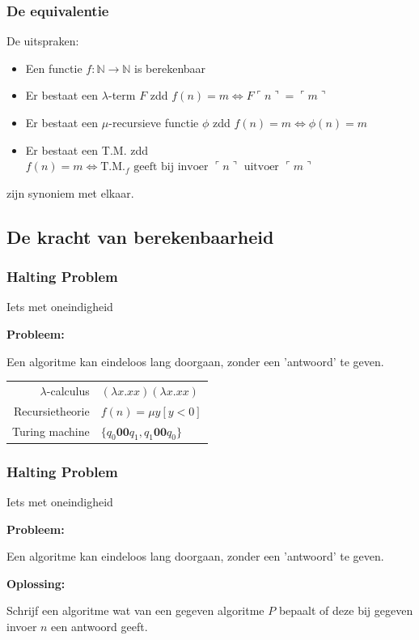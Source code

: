 \documentclass{beamer}
\begin{document}
\begin{frame}
    \frametitle{De equivalentie}

    De uitspraken:
    \begin{itemize}
        \item Een functie $f:\mathbb{N} \rightarrow \mathbb{N}$ is berekenbaar
        \item Er bestaat een $\lambda$-term $F$ zdd $f(n) = m \Leftrightarrow F \ulcorner n\urcorner = \ulcorner m\urcorner $
        \item Er bestaat een $\mu$-recursieve functie $\phi$ zdd $f(n) = m \Leftrightarrow \phi(n) = m$
        \item Er bestaat een T.M. zdd $f(n) = m \Leftrightarrow \text{T.M.}_f \text{ geeft bij invoer } \ulcorner n\urcorner \text{ uitvoer } \ulcorner m\urcorner$
    \end{itemize}

    zijn synoniem met elkaar.
\end{frame}

\subsection{De kracht van berekenbaarheid}
\begin{frame}
    \frametitle{Halting Problem}
    {\Large Iets met oneindigheid}
    \vspace{1cm}

    \textbf{Probleem:}

    Een algoritme kan eindeloos lang doorgaan, zonder een 'antwoord' te geven.\\
    \vspace{1cm}

    \begin{tabular*}{0.8\textwidth}{r l}
        $\lambda$-calculus & $(\lambda x.xx)(\lambda x.xx)$ \\
        Recursietheorie & $f(n) = \mu y [y<0]$ \\
        Turing machine & $\{ q_0\mathbf{0}\mathbf{0}q_1, q_1\mathbf{0}\mathbf{0}q_0 \}$
    \end{tabular*}
\end{frame}

\begin{frame}
    \frametitle{Halting Problem}
    {\Large Iets met oneindigheid}
    \vspace{1cm}

    \textbf{Probleem:}

    Een algoritme kan eindeloos lang doorgaan, zonder een 'antwoord' te geven.\\
    \vspace{1cm}

    \textbf{Oplossing:}

    Schrijf een algoritme wat van een gegeven algoritme $P$ bepaalt of deze bij gegeven invoer $n$ een antwoord geeft.

    \begin{center}
    \end{center}
\end{frame}
\end{document}
